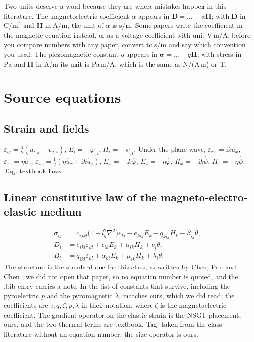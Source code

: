 \documentclass[11pt,a4paper]{article}
\newcommand{\eps}{\varepsilon}
\newcommand{\ii}{\mathrm{i}}
\newcommand{\bx}{\hat u_x}
\newcommand{\bz}{\hat u_z}
\newcommand{\bp}{\hat\varphi}
\newcommand{\bpsi}{\hat\psi}
\newcommand{\aME}{\alpha}
\begin{document}
Two units deserve a word because they are where mistakes happen in this literature. The magnetoelectric
coefficient $\aME$ appears in $\mathbf D=\dots+\aME\mathbf H$; with $\mathbf D$ in C/m$^2$ and $\mathbf H$ in
A/m, the unit of $\aME$ is s/m. Some papers write the coefficient in the magnetic equation instead, or as a
voltage coefficient with unit V\,m/A; before you compare numbers with any paper, convert to s/m and say which
convention you used. The piezomagnetic constant $q$ appears in $\boldsymbol\sigma=\dots-q\mathbf H$; with
stress in Pa and $\mathbf H$ in A/m its unit is Pa\,m/A, which is the same as N/(A\,m) or T.

\section{Source equations}\label{sec:src}

\subsection{Strain and fields}

$\eps_{ij}=\tfrac12(u_{i,j}+u_{j,i})$, $E_i=-\varphi_{,i}$, $H_i=-\psi_{,i}$. Under the plane wave,
$\eps_{xx}=\ii k\bx$, $\eps_{zz}=\eta\bz$, $\eps_{xz}=\tfrac12(\eta\bx+\ii k\bz)$, $E_x=-\ii k\bp$,
$E_z=-\eta\bp$, $H_x=-\ii k\bpsi$, $H_z=-\eta\bpsi$. Tag: textbook laws.

\subsection{Linear constitutive law of the magneto-electro-elastic medium}

\begin{equation}\label{eq:const}
\begin{aligned}
\sigma_{ij}&=c_{ijkl}\bigl(1-l_g^2\nabla^2\bigr)\eps_{kl}-e_{kij}E_k-q_{kij}H_k-\beta_{ij}\theta,\\
D_i&=e_{ikl}\eps_{kl}+\epsilon_{ik}E_k+\aME_{ik}H_k+p_i\theta,\\
B_i&=q_{ikl}\eps_{kl}+\aME_{ki}E_k+\mu_{ik}H_k+\lambda_i\theta .
\end{aligned}
\end{equation}
The structure is the standard one for this class, as written by Chen, Pan and Chen \cite{Chen2007}; we did
not open that paper, so no equation number is quoted, and the .bib entry carries a note. In \cite[Sec.~2]{Tocci2021} the list of
constants that survive, including the pyroelectric $p$ and the pyromagnetic $\lambda$, matches ours, which we did read; the coefficients are
$e,q,\zeta,p,\lambda$ in their notation, where $\zeta$ is the magnetoelectric coefficient. The gradient
operator on the elastic strain is the NSGT placement, ours, and the two thermal terms are textbook.
Tag: taken from the class literature without an equation number; the size operator is ours.
\end{document}
